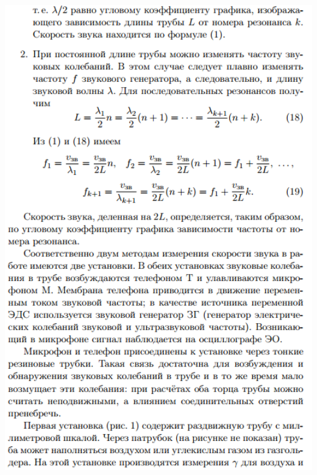 \documentclass[12pt]{article}
\begin{document}
\begin{center}
    	\includegraphics[width=16cm]{theory_7.png}

\end{center}
\end{document}
